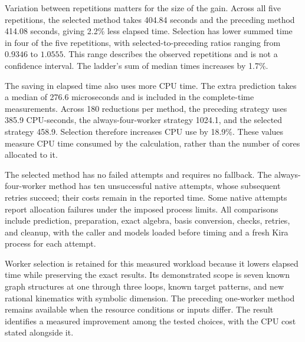 \FloatBarrier

Variation between repetitions matters for the size of the gain. Across all five repetitions, the selected method takes 404.84 seconds and the preceding method 414.08 seconds, giving 2.2\% less elapsed time. Selection has lower summed time in four of the five repetitions, with selected-to-preceding ratios ranging from $0.9346$ to $1.0555$. This range describes the observed repetitions and is not a confidence interval. The ladder's sum of median times increases by 1.7\%.

The saving in elapsed time also uses more CPU time. The extra prediction takes a median of 276.6 microseconds and is included in the complete-time measurements. Across 180 reductions per method, the preceding strategy uses 385.9 CPU-seconds, the always-four-worker strategy 1024.1, and the selected strategy 458.9. Selection therefore increases CPU use by 18.9\%. These values measure CPU time consumed by the calculation, rather than the number of cores allocated to it.

The selected method has no failed attempts and requires no fallback. The always-four-worker method has ten unsuccessful native attempts, whose subsequent retries succeed; their costs remain in the reported time. Some native attempts report allocation failures under the imposed process limits. All comparisons include prediction, preparation, exact algebra, basis conversion, checks, retries, and cleanup, with the caller and models loaded before timing and a fresh Kira process for each attempt.

Worker selection is retained for this measured workload because it lowers elapsed time while preserving the exact results. Its demonstrated scope is seven known graph structures at one through three loops, known target patterns, and new rational kinematics with symbolic dimension. The preceding one-worker method remains available when the resource conditions or inputs differ. The result identifies a measured improvement among the tested choices, with the CPU cost stated alongside it.
